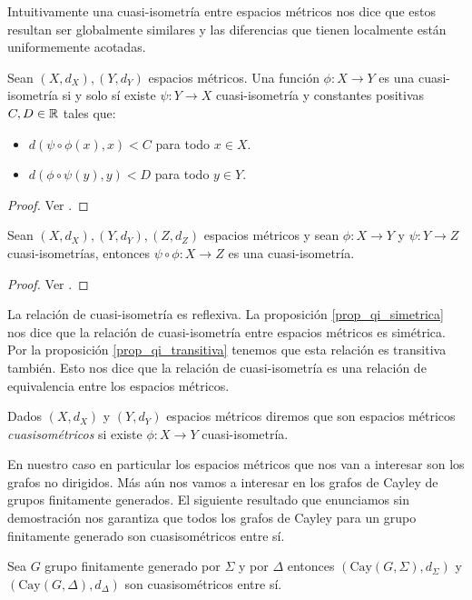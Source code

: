 \documentclass[tesis.tex]{subfiles}
\begin{document}
Intuitivamente una cuasi-isometría entre espacios métricos nos dice que estos resultan ser globalmente similares y las diferencias que tienen localmente están uniformemente acotadas. 

\medskip
\begin{prop}\label{prop_qi_simetrica}
	Sean $(X,d_X),(Y,d_Y)$ espacios métricos. 
	Una función $\phi:X \to Y$ es una cuasi-isometría si y solo sí existe 
	$\psi:Y \to X$ cuasi-isometría y constantes positivas $C,D \in \mathbb{R}$ tales que:
	\begin{itemize}
		\item $d(\psi \circ \phi (x), x) < C$ para todo $x \in X$.
		\item $d(\phi \circ \psi (y), y) < D$ para todo $y \in Y$. 
	\end{itemize}
\end{prop}
\begin{proof}
	Ver \cite[pp.84-85]{loh2017geometric}.
\end{proof}

\begin{prop}\label{prop_qi_transitiva}
	Sean $(X,d_X),(Y,d_Y), (Z, d_{Z})$ espacios métricos y sean $\phi:X \to Y$ y $\psi:Y \to Z$ cuasi-isometrías,
	 entonces $\psi \circ \phi: X \to Z$ es una cuasi-isometría.
\end{prop}
\begin{proof}
	Ver \cite[p.86]{loh2017geometric}.
\end{proof}




La relación de cuasi-isometría es reflexiva.
La proposición \ref{prop_qi_simetrica} nos dice que la relación de cuasi-isometría entre espacios métricos es simétrica.
Por la proposición \ref{prop_qi_transitiva} tenemos que esta relación es transitiva también. 
Esto nos dice que la relación de cuasi-isometría es una relación de equivalencia entre los espacios métricos.
\begin{deff}
	Dados $(X,d_{X})$ y $(Y,d_{Y})$ espacios métricos diremos que son espacios métricos \emph{cuasisométricos} si existe $\phi:X \to Y$ cuasi-isometría. 
\end{deff}



En nuestro caso en particular los espacios métricos que nos van a interesar son los grafos no dirigidos.
Más aún nos vamos a interesar en los grafos de Cayley de grupos finitamente generados.
El siguiente resultado que enunciamos sin demostración nos garantiza que todos los grafos de Cayley para un grupo finitamente generado son cuasisométricos entre sí.
\begin{prop}
	Sea $G$ grupo finitamente generado por $\Sigma$ y por $\Delta$ entonces $(\text{Cay}(G,\Sigma), d_{\Sigma})$ y $(\text{Cay}(G, \Delta), d_{\Delta})$ son cuasisométricos entre sí.
\end{prop}
\end{document}

